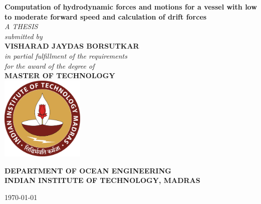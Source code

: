 \begin{titlepage}
\centering

{\doublespacing \huge \bfseries Computation of hydrodynamic forces and motions for a vessel with low to moderate
forward speed and calculation of drift forces} %
\\ [1.2cm]


\emph{\large A THESIS } %
\\[1cm] 

\emph{\large submitted by}
\\[1cm]

{\large \bfseries VISHARAD JAYDAS BORSUTKAR}  %
\\[1cm] 

\emph{\large in partial fulfillment of the requirements \\ for the award of the degree of }
\\ [1 cm]


{\large \bf MASTER OF TECHNOLOGY}
\\[1.5cm]


\includegraphics[width=4cm]{photos/logo.pdf}


\vspace{1.5 cm}
\begin{minipage}{1\textwidth}
\begin{center} \large
\textbf {DEPARTMENT OF OCEAN ENGINEERING \\
INDIAN INSTITUTE OF TECHNOLOGY, MADRAS} %
\\[0.3cm]

\end{center}
\end{minipage} 

\vspace{1 cm}
{\large \today}
\end{titlepage}
